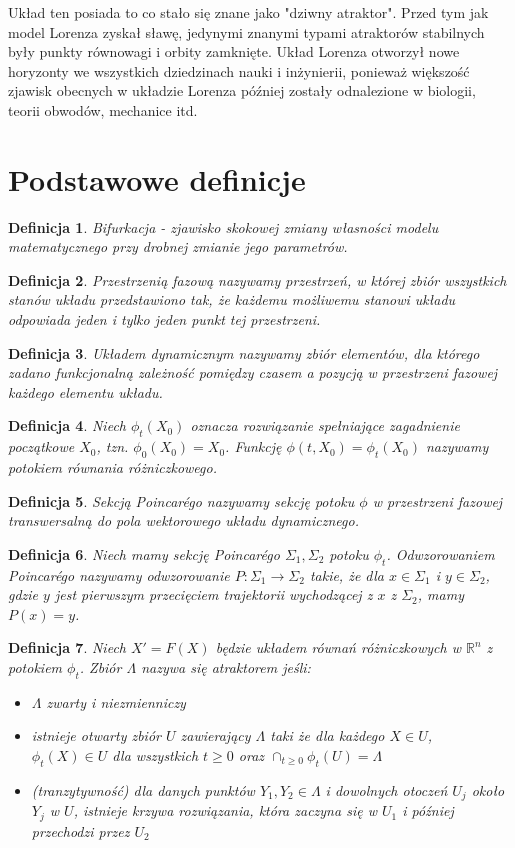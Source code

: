 \documentclass[12pt]{report}
\newtheorem{definition}{Definicja}
\newcommand{\R}{\mathbb{R}}
\begin{document}
	\par Układ ten posiada to co stało się znane jako "dziwny atraktor". Przed tym jak model Lorenza zyskał sławę, jedynymi znanymi typami atraktorów stabilnych były punkty równowagi i orbity zamknięte. Układ Lorenza otworzył nowe horyzonty we wszystkich dziedzinach nauki i inżynierii, ponieważ większość zjawisk obecnych w układzie Lorenza później zostały odnalezione w biologii, teorii obwodów, mechanice itd. \cite{HSD}
	
	\section{Podstawowe definicje}
	\begin{definition}
		Bifurkacja - zjawisko skokowej zmiany własności modelu matematycznego przy drobnej zmianie jego parametrów.
	\end{definition}
	\begin{definition}
		Przestrzenią fazową nazywamy przestrzeń, w której zbiór wszystkich stanów układu przedstawiono tak, że każdemu możliwemu stanowi układu odpowiada jeden i tylko jeden punkt tej przestrzeni.
	\end{definition}
	\begin{definition}
		Układem dynamicznym nazywamy zbiór elementów, dla którego zadano funkcjonalną zależność pomiędzy czasem a pozycją w przestrzeni fazowej każdego elementu układu.
	\end{definition}
	\begin{definition}
		Niech $\phi_t (X_0)$ oznacza rozwiązanie spełniające zagadnienie początkowe $X_0$, tzn. $\phi_0 (X_0) = X_0$. Funkcję $\phi(t, X_0) = \phi_t(X_0)$ nazywamy potokiem równania różniczkowego.
	\end{definition}
	\begin{definition}
		Sekcją Poincarégo nazywamy sekcję potoku $\phi$ w przestrzeni fazowej transwersalną do pola wektorowego układu dynamicznego.
	\end{definition}
	\begin{definition}
		Niech mamy sekcję Poincarégo $\Sigma_1, \Sigma_2$ potoku $\phi_t$. Odwzorowaniem Poincarégo nazywamy odwzorowanie $P : \Sigma_1 \to \Sigma_2$ takie, że dla $x \in \Sigma_1$ i $y \in \Sigma_2$, gdzie $y$ jest pierwszym przecięciem trajektorii wychodzącej z $x$ z $\Sigma_2$, mamy $P(x) = y$.
	\end{definition}
	\begin{definition}
		Niech $X' = F(X)$ będzie układem równań różniczkowych w $\R^n$ z potokiem $\phi_t$. Zbiór $\Lambda$ nazywa się atraktorem jeśli:
		\begin{itemize}
			\item $\Lambda$ zwarty i niezmienniczy
			\item istnieje otwarty zbiór $U$ zawierający $\Lambda$ taki że dla każdego $X \in U$, $\phi_t(X) \in U$ dla wszystkich $t \ge 0$ oraz $\cap_{t \ge 0} \phi_t(U) = \Lambda$
			\item (tranzytywność) dla danych punktów $Y_1, Y_2 \in \Lambda$ i dowolnych otoczeń $U_j$ około $Y_j$ w $U$, istnieje krzywa rozwiązania, która zaczyna się w $U_1$ i później przechodzi przez $U_2$
		\end{itemize}
	\end{definition}
\end{document}
